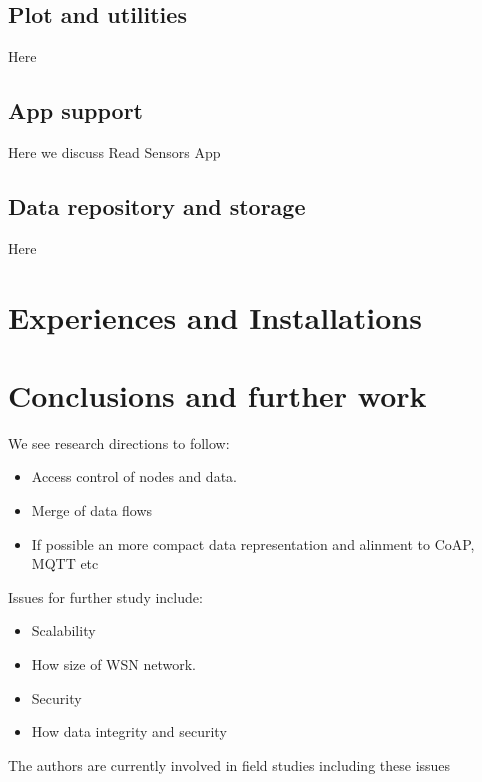 \documentclass[conference, a4paper,10pt,twocolumn]{IEEEtran}
\begin{document}
\subsection{Plot and utilities}
Here

\subsection{App support}
Here we discuss Read Sensors App  ~\cite{read-sensors}

\subsection{Data repository and storage}
Here

\section{Experiences and Installations}
\label{sec:experince}

\section{Conclusions and further work}
\label{sec:conclusion}

We see research directions to follow:

\begin{itemize}
\item Access control of nodes and data. 

\item Merge of data flows 

\item If possible an more compact data representation and alinment to CoAP, MQTT etc

\end{itemize}

Issues for further study include: 

\begin{itemize}
\item Scalability 
\item How size of WSN network.

\item Security
\item How data integrity and security

\end{itemize} 

The authors are currently involved in field studies including these issues
\end{document}
